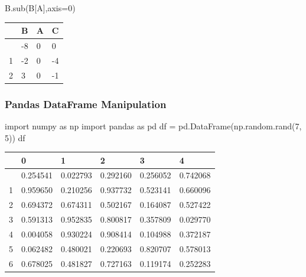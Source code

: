 \documentclass[
  a4paper,
  DIV=11,
  numbers=noendperiod]{scrreprt}
\newenvironment{Shaded}{\begin{snugshade}}{\end{snugshade}}
\newcommand{\DecValTok}[1]{\textcolor[rgb]{0.68,0.00,0.00}{#1}}
\newcommand{\ImportTok}[1]{\textcolor[rgb]{0.00,0.46,0.62}{#1}}
\newcommand{\NormalTok}[1]{\textcolor[rgb]{0.00,0.23,0.31}{#1}}
\newcommand{\OperatorTok}[1]{\textcolor[rgb]{0.37,0.37,0.37}{#1}}
\newcommand{\StringTok}[1]{\textcolor[rgb]{0.13,0.47,0.30}{#1}}
\begin{document}
\begin{Shaded}
\begin{Highlighting}[]
\NormalTok{B.sub(B[}\StringTok{\textquotesingle{}A\textquotesingle{}}\NormalTok{],axis}\OperatorTok{=}\DecValTok{0}\NormalTok{)}
\end{Highlighting}
\end{Shaded}

\begin{longtable}[]{@{}llll@{}}
\toprule\noalign{}
& B & A & C \\
\midrule\noalign{}
\endhead
\bottomrule\noalign{}
\endlastfoot
0 & -8 & 0 & 0 \\
1 & -2 & 0 & -4 \\
2 & 3 & 0 & -1 \\
\end{longtable}

\subsubsection{Pandas DataFrame
Manipulation}\label{pandas-dataframe-manipulation}

\begin{Shaded}
\begin{Highlighting}[]
\ImportTok{import}\NormalTok{ numpy }\ImportTok{as}\NormalTok{ np}
\ImportTok{import}\NormalTok{ pandas }\ImportTok{as}\NormalTok{ pd}
\NormalTok{df }\OperatorTok{=}\NormalTok{ pd.DataFrame(np.random.rand(}\DecValTok{7}\NormalTok{, }\DecValTok{5}\NormalTok{))}
\NormalTok{df}
\end{Highlighting}
\end{Shaded}

\begin{longtable}[]{@{}llllll@{}}
\toprule\noalign{}
& 0 & 1 & 2 & 3 & 4 \\
\midrule\noalign{}
\endhead
\bottomrule\noalign{}
\endlastfoot
0 & 0.254541 & 0.022793 & 0.292160 & 0.256052 & 0.742068 \\
1 & 0.959650 & 0.210256 & 0.937732 & 0.523141 & 0.660096 \\
2 & 0.694372 & 0.674311 & 0.502167 & 0.164087 & 0.527422 \\
3 & 0.591313 & 0.952835 & 0.800817 & 0.357809 & 0.029770 \\
4 & 0.004058 & 0.930224 & 0.908414 & 0.104988 & 0.372187 \\
5 & 0.062482 & 0.480021 & 0.220693 & 0.820707 & 0.578013 \\
6 & 0.678025 & 0.481827 & 0.727163 & 0.119174 & 0.252283 \\
\end{longtable}
\end{document}
